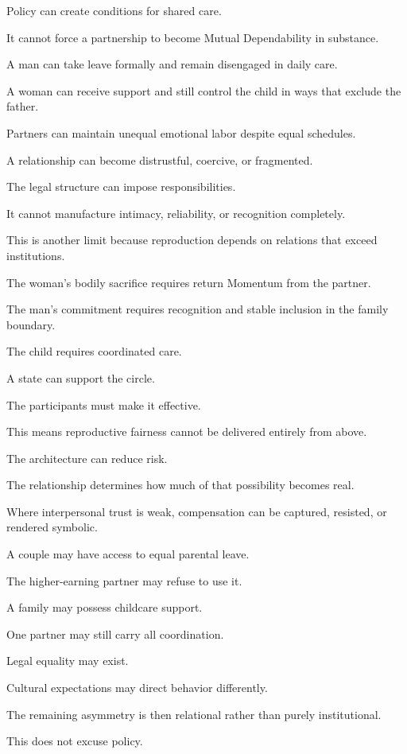 Policy can create conditions for shared care.

It cannot force a partnership to become Mutual Dependability in substance.

A man can take leave formally and remain disengaged in daily care.

A woman can receive support and still control the child in ways that exclude the father.

Partners can maintain unequal emotional labor despite equal schedules.

A relationship can become distrustful, coercive, or fragmented.

The legal structure can impose responsibilities.

It cannot manufacture intimacy, reliability, or recognition completely.

This is another limit because reproduction depends on relations that exceed institutions.

The woman’s bodily sacrifice requires return Momentum from the partner.

The man’s commitment requires recognition and stable inclusion in the family boundary.

The child requires coordinated care.

A state can support the circle.

The participants must make it effective.

This means reproductive fairness cannot be delivered entirely from above.

The architecture can reduce risk.

The relationship determines how much of that possibility becomes real.

Where interpersonal trust is weak, compensation can be captured, resisted, or rendered symbolic.

A couple may have access to equal parental leave.

The higher-earning partner may refuse to use it.

A family may possess childcare support.

One partner may still carry all coordination.

Legal equality may exist.

Cultural expectations may direct behavior differently.

The remaining asymmetry is then relational rather than purely institutional.

This does not excuse policy.

